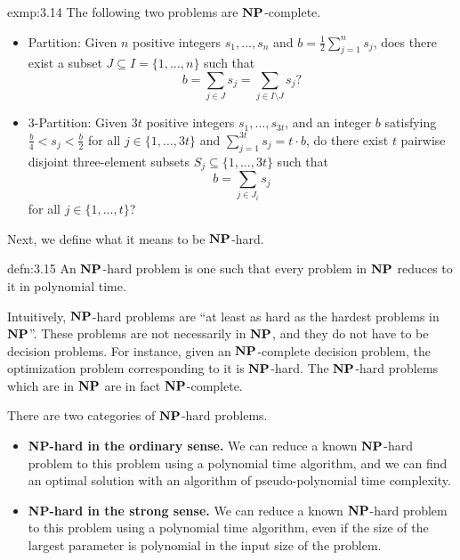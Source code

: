 \begin{exmp}{exmp:3.14}
    The following two problems are $\operatorname{\textbf{NP}}$-complete. 
    \begin{itemize}
        \item {\sc Partition}: Given $n$ positive integers $s_1, \dots, s_n$ 
        and $b = \frac12 \sum_{j=1}^n s_j$, does there exist a subset 
        $J \subseteq I = \{1, \dots, n\}$ such that 
        \[ b = \sum_{j\in J} s_j = \sum_{j\in I\setminus J} s_j? \] 
        \item {\sc $3$-Partition}: Given $3t$ positive integers 
        $s_1, \dots, s_{3t}$, and an integer $b$ satisfying 
        $\frac{b}{4} < s_j < \frac{b}{2}$ for all $j \in \{1, \dots, 3t\}$ 
        and $\sum_{j=1}^{3t} s_j = t \cdot b$, do there exist 
        $t$ pairwise disjoint three-element subsets $S_j \subseteq 
        \{1, \dots, 3t\}$ such that 
        \[ b = \sum_{j\in J_i} s_j \] 
        for all $j \in \{1, \dots, t\}$? 
    \end{itemize}
\end{exmp}

Next, we define what it means to be $\operatorname{\textbf{NP}}$-hard. 

\begin{defn}{defn:3.15}
    An $\operatorname{\textbf{NP}}$-hard problem is one such that every problem in $\operatorname{\textbf{NP}}$ 
    reduces to it in polynomial time. 
\end{defn}

Intuitively, $\operatorname{\textbf{NP}}$-hard problems are ``at least as hard as the hardest 
problems in $\operatorname{\textbf{NP}}$''. These problems are not necessarily in $\operatorname{\textbf{NP}}$, and they 
do not have to be decision problems. For instance, given an $\operatorname{\textbf{NP}}$-complete 
decision problem, the optimization problem corresponding to it is $\operatorname{\textbf{NP}}$-hard. 
The $\operatorname{\textbf{NP}}$-hard problems which are in $\operatorname{\textbf{NP}}$ are in fact $\operatorname{\textbf{NP}}$-complete. 

There are two categories of $\operatorname{\textbf{NP}}$-hard problems.  
\begin{itemize}
    \item {\bf NP-hard in the ordinary sense.} We can reduce a known 
    $\operatorname{\textbf{NP}}$-hard problem to this problem using a polynomial time algorithm, 
    and we can find an optimal solution with an algorithm of pseudo-polynomial 
    time complexity. 
    \item {\bf NP-hard in the strong sense.} We can reduce a known 
    $\operatorname{\textbf{NP}}$-hard problem to this problem using a polynomial time algorithm, 
    even if the size of the largest parameter is polynomial in the 
    input size of the problem. 
\end{itemize}

